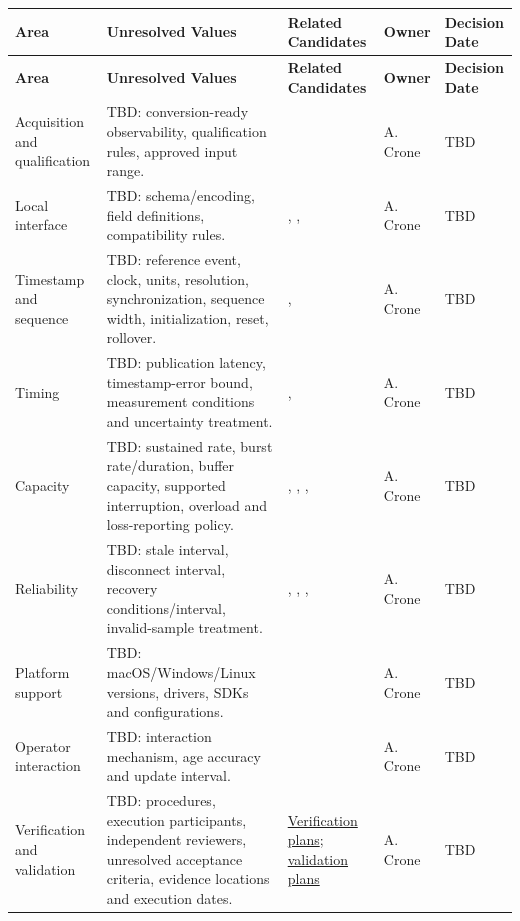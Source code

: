 \begin{tabularx}{\linewidth}{L{2.7cm}YL{3.2cm}L{1.7cm}L{1.8cm}}
\caption{Project Unresolved Values\label{Table:ProjectUnresolvedValues}}\\
\toprule\textbf{Area} & \textbf{Unresolved Values} & \textbf{Related Candidates} & \textbf{Owner} & \textbf{Decision Date}\\\midrule\endfirsthead
\toprule\textbf{Area} & \textbf{Unresolved Values} & \textbf{Related Candidates} & \textbf{Owner} & \textbf{Decision Date}\\\midrule\endhead\bottomrule\endlastfoot
Acquisition and qualification & TBD: conversion-ready observability, qualification rules, approved input range. &  & A. Crone & TBD\\
Local interface & TBD: schema/encoding, field definitions, compatibility rules. & , ,  & A. Crone & TBD\\
Timestamp and sequence & TBD: reference event, clock, units, resolution, synchronization, sequence width, initialization, reset, rollover. & ,  & A. Crone & TBD\\
Timing & TBD: publication latency, timestamp-error bound, measurement conditions and uncertainty treatment. & ,  & A. Crone & TBD\\
Capacity & TBD: sustained rate, burst rate/duration, buffer capacity, supported interruption, overload and loss-reporting policy. & , , ,  & A. Crone & TBD\\
Reliability & TBD: stale interval, disconnect interval, recovery conditions/interval, invalid-sample treatment. & , , ,  & A. Crone & TBD\\
Platform support & TBD: macOS/Windows/Linux versions, drivers, SDKs and configurations. &  & A. Crone & TBD\\
Operator interaction & TBD: interaction mechanism, age accuracy and update interval. &  & A. Crone & TBD\\
Verification and validation & TBD: procedures, execution participants, independent reviewers, unresolved acceptance criteria, evidence locations and execution dates. & \hyperref[Table:ProjectVerificationRegister]{Verification plans}; \hyperref[Table:ProjectValidationRegister]{validation plans} & A. Crone & TBD\\
\end{tabularx}
